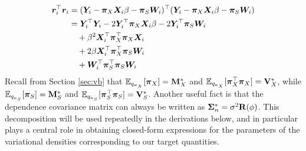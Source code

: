 \documentclass[numsec,webpdf,modern,medium,namedate]{oup-authoring-template}
\theoremstyle{thmstyleone}%
\theoremstyle{thmstyletwo}%
\theoremstyle{thmstylethree}%
\begin{document}
\begin{equation}\label{eq:residual-qf}
\begin{split}
    \boldsymbol{r}_i^\top \boldsymbol{r}_i &= (\boldsymbol{Y}_i - \boldsymbol{\pi}_X \boldsymbol{X}_i \beta - \boldsymbol{\pi}_S \boldsymbol{W}_i)^\top (\boldsymbol{Y}_i - \boldsymbol{\pi}_X \boldsymbol{X}_i \beta - \boldsymbol{\pi}_S \boldsymbol{W}_i) \\
&= \boldsymbol{Y}_i^\top \boldsymbol{Y}_i - 2 \boldsymbol{Y}_i^\top \boldsymbol{\pi}_X \boldsymbol{X}_i \beta - 2 \boldsymbol{Y}_i^\top \boldsymbol{\pi}_S \boldsymbol{W}_i \\
&\quad + \beta^2 \boldsymbol{X}_i^\top \boldsymbol{\pi}_X^\top \boldsymbol{\pi}_X \boldsymbol{X}_i \\
&\quad + 2 \beta \boldsymbol{X}_i^\top \boldsymbol{\pi}_X^\top \boldsymbol{\pi}_S \boldsymbol{W}_i \\
&\quad + \boldsymbol{W}_i^\top \boldsymbol{\pi}_S^\top \boldsymbol{\pi}_S \boldsymbol{W}_i 
\end{split}
\end{equation}
Recall from Section \ref{sec:vb} that $\mathbb{E}_{q_{\kappa_X}}[\boldsymbol{\pi}_X] = \mathbf{M}^\ast_X$ and $\mathbb{E}_{q_{\kappa_X}}[\boldsymbol{\pi}_X^\top \boldsymbol{\pi}_X] = \mathbf{V}^\ast_X$, while $\mathbb{E}_{q_{\kappa_S}}[\boldsymbol{\pi}_S] = \mathbf{M}^\ast_S$ and $\mathbb{E}_{q_{\kappa_S}}[\boldsymbol{\pi}_S^\top \boldsymbol{\pi}_S] = \mathbf{V}^\ast_S$. Another useful fact is that the dependence covariance matrix can always be written as $\boldsymbol{\Sigma}^\ast_n = \sigma^2 \mathbf{R}(\phi)$. This decomposition will be used repeatedly in the derivations below, and in particular plays a central role in obtaining closed-form expressions for the parameters of the variational densities corresponding to our target quantities. 
\end{document}
